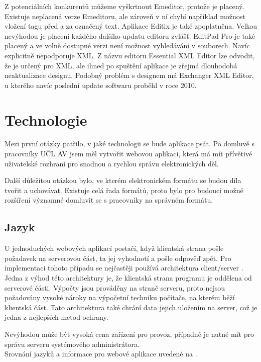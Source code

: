              Z potenciálních konkurentů můžeme vyškrtnout Emeditor, protože je placený. Existuje neplacená verze Emeditoru, ale zároveň v ní chybí například možnost vložení tagu před a za označený text. Aplikace Editix je také zpoplatněna. Velkou nevýhodou je placení každého dalšího updatu editoru zvlášť. EditPad Pro je také placený a ve volně dostupné verzi není možnost vyhledávání v souborech. Navíc explicitně nepodporuje XML. Z názvu editoru Essential XML Editor lze odvodit, že je určený pro XML, ale ihned po spuštění aplikace je zřejmá dlouhodobá neaktualizace designu. Podobný problém s designem má Exchanger XML Editor, u kterého navíc poslední update softwaru proběhl v roce 2010.
        
            
    \section{Technologie}
        Mezi první otázky patřilo, v jaké technologii se bude aplikace psát. Po domluvě s pracovníky UČL AV jsem měl vytvořit webovou aplikaci, která má mít přívětivé uživatelské rozhraní pro snadnou a rychlou správu elektronických děl.
        
        Další důležitou otázkou bylo, ve kterém elektronickém formátu se budou díla tvořit a uchovávat. Existuje celá řada formátů, proto bylo pro budoucí možné rozšíření významné domluvit se s pracovníky na správném formátu.
        
        \subsection{Jazyk}
            U jednoduchých webových aplikací postačí, když klientská strana pošle požadavek na serverovou část, ta jej vyhodnotí a pošle odpověď zpět. Pro implementaci tohoto případu se nejčastěji používá architektura client/server \cite{languages}. 
            Jedna z výhod této architektury je, že klientská strana programu je oddělena od serverové části. Výpočty jsou prováděny na straně serveru, proto nejsou požadovány vysoké nároky na výpočetní techniku počítače, na kterém běží klientská část. Tato architektura také chrání data jejich uložením na server, což je jedna z nejlepších metod ochrany.
            
            Nevýhodou může být vysoká cena zařízení pro provoz, případně je nutné mít pro správu serveru systémového administrátora.\\
            Srovnání jazyků a informace pro webové aplikace uvedené na \cite{languages}.
            
